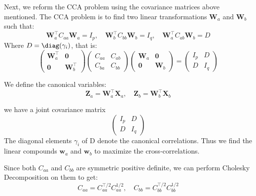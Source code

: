 Next, we reform the CCA problem using the covariance matrices above mentioned. The CCA problem is to find two linear transformations $\mathbf{W}_a$ and $\mathbf{W}_b$ such that:
\begin{equation}
     \mathbf{W}_a^\top C_{aa} \mathbf{W}_a = I_p, \quad  \mathbf{W}_b^\top C_{bb} \mathbf{W}_b = I_q, \quad  \mathbf{W}_a^\top C_{ab}  \mathbf{W}_b = D
\end{equation}
Where $D=\diag (\gamma_i)$, that is:
\begin{equation}
\begin{pmatrix}
     \mathbf{W}_a^\top & {\mathbf 0}\\
    {\mathbf 0} &  \mathbf{W}_b^\top
    \end{pmatrix}
    \begin{pmatrix}
    C_{aa} & C_{ab}\\
    C_{ba} & C_{bb}
    \end{pmatrix}
    \begin{pmatrix}
     \mathbf{W}_a & {\mathbf 0}\\
    {\mathbf 0} &  \mathbf{W}_b
    \end{pmatrix}
    =
    \begin{pmatrix}
    I_p & D\\
    D & I_q
\end{pmatrix}
\end{equation}

We define the canonical variables:
\begin{equation}
    \mathbf{Z}_a= \mathbf{W}_a^\top \mathbf{X}_a, \quad \mathbf{Z}_b = \mathbf{W}_b^\top \mathbf{X}_b
\end{equation}

we have a joint covariance matrix
\begin{equation}
    \begin{pmatrix}
    I_p & D \\
    D & I_q
    \end{pmatrix}
\end{equation}
The diagonal elements $\gamma_i$ of D denote the canonical correlations. Thus we find the linear compounds $\mathbf{w}_a$ and $\mathbf{w}_b$ to maximize the cross-correlations. 

Since both $C_{aa}$ and $C_{bb}$ are symmetric positive definite, we can perform Cholesky Decomposition on them to get:
\begin{equation}
    C_{aa} = C_{aa}^{\top/2} C_{aa}^{1/2}, \quad C_{bb} = C_{bb}^{\top/2} C_{bb}^{1/2}
\end{equation}

